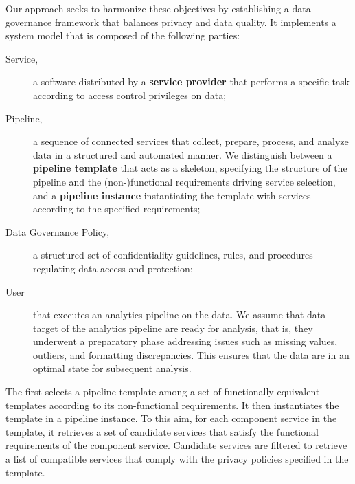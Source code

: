 Our approach seeks to harmonize these objectives by establishing a data governance framework that balances privacy and data quality. It implements a system model that is composed of the following parties:
\begin{description}
  \item[Service,] a software distributed by a \textbf{service provider} that performs a specific task according to access control privileges on data; %
  \item[Pipeline,] a sequence of connected services that collect, prepare, process, and analyze data in a structured and automated manner. We distinguish between a \textbf{pipeline template} that acts as a skeleton, specifying the structure of the pipeline and the (non-)functional requirements driving  service selection, and a \textbf{pipeline instance} instantiating the template with services according to the specified requirements;
  \item[Data Governance Policy,] a structured set of confidentiality guidelines, rules, and procedures regulating data access and protection;
  \item[User] that executes an analytics pipeline on the data. We assume that data target of the analytics pipeline are ready for analysis, that is, they underwent a preparatory phase addressing issues such as missing values, outliers, and formatting discrepancies. This ensures that the data are in an optimal state for subsequent analysis.
\end{description}

The \user first selects a pipeline template among a set of functionally-equivalent templates according to its non-functional requirements. It then instantiates the template in a pipeline instance. To this aim, for each component service in the template, it retrieves a set of candidate services that satisfy the functional requirements of the component service. Candidate services are filtered to retrieve a list of compatible services that comply with the privacy policies specified in the template.

